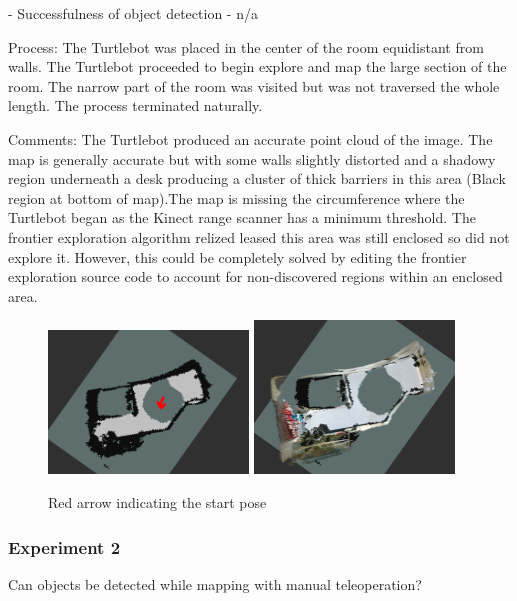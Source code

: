 \documentclass{mproj}
\begin{document}
- Successfulness of object detection - n/a


Process: The Turtlebot was placed in the center of the room equidistant from walls. The Turtlebot proceeded to begin explore and map the large section of the room. The narrow part of the room was visited but was not traversed the whole length. The process terminated naturally.

Comments: The Turtlebot produced an accurate point cloud of the image. The  map is generally accurate but with some walls slightly distorted and a shadowy region underneath a desk producing a cluster of thick barriers in this area (Black region at bottom of map).The map is missing the circumference where the Turtlebot began as the Kinect range scanner has a minimum threshold. The frontier exploration algorithm relized leased this area was still enclosed so did not explore it. However, this could be completely solved by editing the frontier exploration source code to account for non-discovered regions within an enclosed area. 
\begin{figure}
   \caption{Red arrow indicating the start pose}
   \centering
   \includegraphics[width=0.475\textwidth]{images/exp1map.png}
   \hfill
   \includegraphics[width=0.475\textwidth]{images/ex1pc.png}
\end{figure}


\subsubsection{Experiment 2}

Can objects be detected while mapping with manual teleoperation?
\end{document}
